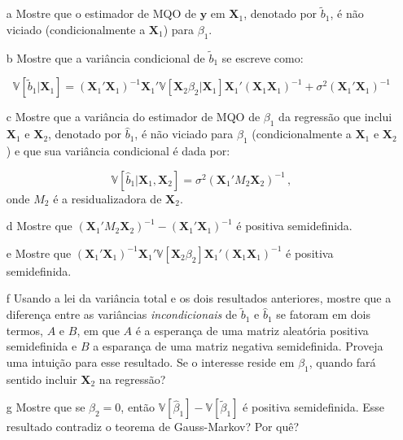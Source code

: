 \documentclass[10pt,a4paper]{article}
\begin{document}
 \begin{itemize}
 	\item[a] Mostre que o estimador de MQO de $\boldsymbol{y}$ em $\boldsymbol{X}_1$, denotado por $\tilde{b}_1$, é não viciado (condicionalmente a $\boldsymbol{X}_1$) para $\beta_1$.
 	\item[b] Mostre que a variância condicional de $\tilde{b}_1$ se escreve como:
 	
 	$$\mathbb{V}[\tilde{b}_1|\boldsymbol{X}_1] = 	(\boldsymbol{X}_1'\boldsymbol{X}_1)^{-1}\boldsymbol{X}_1'\mathbb{V}[\boldsymbol{X}_2\beta_2|\boldsymbol{X}_1]\boldsymbol{X}_1'(\boldsymbol{X}_1\boldsymbol{X}_1)^{-1} + \sigma^2 (\boldsymbol{X}_1'\boldsymbol{X}_1)^{-1}$$
 	
 	\item[c] Mostre que a variância do estimador de MQO de $\beta_1$ da regressão que inclui $\boldsymbol{X}_1$ e $\boldsymbol{X}_2$, denotado por $\hat{b}_1$, é não viciado para $\beta_1$ (condicionalmente a $\boldsymbol{X}_1$ e $\boldsymbol{X}_2$) e que sua variância condicional é dada por:
 	
 	$$\mathbb{V}[\hat{b}_1|\boldsymbol{X}_1,\boldsymbol{X}_2] = \sigma^2\left(\boldsymbol{X}_1'M_2 \boldsymbol{X}_2\right)^{-1}\, , $$
 	onde $M_2$ é a residualizadora de $\boldsymbol{X}_2$.
 	
 	\item[d] Mostre que $\left(\boldsymbol{X}_1'M_2 \boldsymbol{X}_2\right)^{-1} - (\boldsymbol{X}_1'\boldsymbol{X}_1)^{-1}$ é positiva semidefinida.
 	
 	\item[e] Mostre que $(\boldsymbol{X}_1'\boldsymbol{X}_1)^{-1}\boldsymbol{X}_1'\mathbb{V}[\boldsymbol{X}_2\beta_2]\boldsymbol{X}_1'(\boldsymbol{X}_1\boldsymbol{X}_1)^{-1} $ é positiva semidefinida.
 	
 	\item[f] Usando a  lei da variância total e os dois resultados anteriores, mostre que a diferença entre as variâncias \emph{incondicionais} de $\tilde{b}_1$ e $\hat{b}_1$ se fatoram em dois termos, $A$ e $B$, em que $A$ é a esperança de uma matriz aleatória positiva semidefinida e $B$ a esparança de uma matriz negativa semidefinida. Proveja uma intuição para esse resultado. Se o interesse reside em $\beta_1$, quando fará sentido incluir $\boldsymbol{X}_2$ na regressão?
 	\item[g] Mostre que se $\beta_2 = 0$, então  $\mathbb{V}[\hat{\beta}_1] - \mathbb{V}[\tilde{\beta}_1] $ é positiva semidefinida. Esse resultado contradiz o teorema de Gauss-Markov? Por quê?
 \end{itemize}
 
\end{document}
